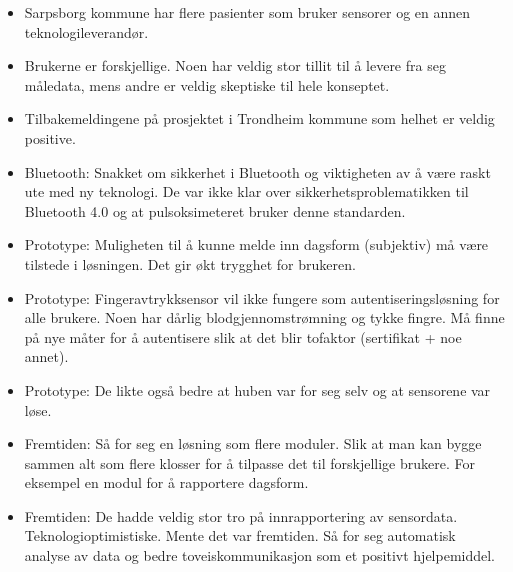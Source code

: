 \begin{itemize}
  \begin{itemize}
  \tightlist
  \item
    Sarpsborg kommune har flere pasienter som bruker sensorer og en
    annen teknologileverandør.
  \item
    Brukerne er forskjellige. Noen har veldig stor tillit til å levere
    fra seg måledata, mens andre er veldig skeptiske til hele konseptet.
  \item
    Tilbakemeldingene på prosjektet i Trondheim kommune som helhet er
    veldig positive.
  \item
    Bluetooth: Snakket om sikkerhet i Bluetooth og viktigheten av å være
    raskt ute med ny teknologi. De var ikke klar over
    sikkerhetsproblematikken til Bluetooth 4.0 og at pulsoksimeteret
    bruker denne standarden.
  \item
    Prototype: Muligheten til å kunne melde inn dagsform (subjektiv) må
    være tilstede i løsningen. Det gir økt trygghet for brukeren.
  \item
    Prototype: Fingeravtrykksensor vil ikke fungere som
    autentiseringsløsning for alle brukere. Noen har dårlig
    blodgjennomstrømning og tykke fingre. Må finne på nye måter for å
    autentisere slik at det blir tofaktor (sertifikat + noe annet).
  \item
    Prototype: De likte også bedre at huben var for seg selv og at
    sensorene var løse.
  \item
    Fremtiden: Så for seg en løsning som flere moduler. Slik at man kan bygge
    sammen alt som flere klosser for å tilpasse det til forskjellige
    brukere. For eksempel en modul for å rapportere dagsform.
  \item
    Fremtiden: De hadde veldig stor tro på innrapportering av sensordata.
    Teknologioptimistiske. Mente det var fremtiden. Så for seg
    automatisk analyse av data og bedre toveiskommunikasjon som et
    positivt hjelpemiddel.
  \end{itemize}
\end{itemize}